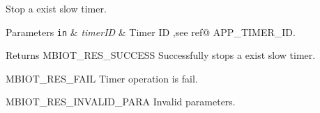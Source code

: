 Stop a exist slow timer. 


\begin{DoxyParams}[1]{Parameters}
\mbox{\tt in}  & {\em timer\+ID} & Timer ID ,see ref@ A\+P\+P\+\_\+\+T\+I\+M\+E\+R\+\_\+\+ID.\\
\hline
\end{DoxyParams}
\begin{DoxyReturn}{Returns}
M\+B\+I\+O\+T\+\_\+\+R\+E\+S\+\_\+\+S\+U\+C\+C\+E\+SS Successfully stops a exist slow timer. 

M\+B\+I\+O\+T\+\_\+\+R\+E\+S\+\_\+\+F\+A\+IL Timer operation is fail. 

M\+B\+I\+O\+T\+\_\+\+R\+E\+S\+\_\+\+I\+N\+V\+A\+L\+I\+D\+\_\+\+P\+A\+RA Invalid parameters. 
\end{DoxyReturn}
